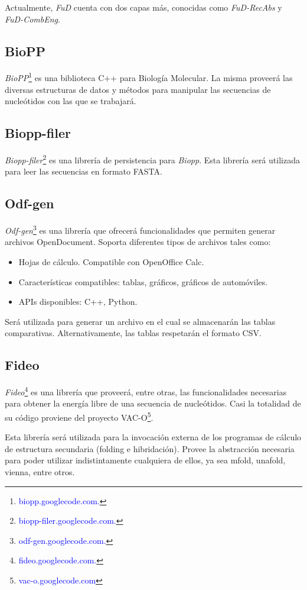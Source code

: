 \documentclass[12pt,a4paper,spanish]{article}
\begin{document}
		\par Actualmente, \emph{FuD} cuenta con dos capas más, conocidas como 
		\emph{FuD-RecAbs} y \emph{FuD-CombEng}.

	\subsection{BioPP}
		\par \textit{BioPP}\footnote{\textcolor{blue}{biopp.googlecode.com.}} es una biblioteca C++ para Biología 			Molecular. La misma proveerá las diversas estructuras de datos y métodos para manipular las secuencias de 			nucleótidos con las que se trabajará. 

	\subsection{Biopp-filer}
		 \par \textit{Biopp-filer}\footnote{\textcolor{blue}{biopp-filer.googlecode.com.}} es una librería de persistencia 			 para \emph{Biopp}. Esta librería será utilizada para leer las secuencias en formato FASTA.  

	\subsection{Odf-gen}
		\textit{Odf-gen}\footnote{\textcolor{blue}{odf-gen.googlecode.com.}} es una librería que ofrecerá funcionalidades 			que permiten generar archivos OpenDocument. Soporta diferentes tipos de archivos tales como:
		\begin{itemize}
			\item Hojas de cálculo. Compatible con OpenOffice Calc.
			\item Características compatibles: tablas, gráficos, gráficos de automóviles.
			\item APIs disponibles: C++, Python.
		\end{itemize}
		 \par Será utilizada para generar un archivo en el cual se almacenarán las tablas comparativas.	Alternativamente, 			las tablas respetarán el formato \textsf{CSV}.
		 
	\subsection{Fideo}
			\textit{Fideo}\footnote{\textcolor{blue}{fideo.googlecode.com.}} es una librería que proveerá, entre otras, 			las funcionalidades necesarias para obtener la energía libre de una secuencia de nucleótidos. Casi la 				totalidad de su código proviene del proyecto VAC-O\footnote{\textcolor{blue}{vac-o.googlecode.com}}.
			\par Esta librería será utilizada para la invocación externa de los programas de cálculo de estructura 				secundaria (folding e hibridación). Provee la abstracción necesaria para poder utilizar indistintamente 			cualquiera de ellos, ya sea mfold, unafold, vienna, entre otros.	 
\end{document}
